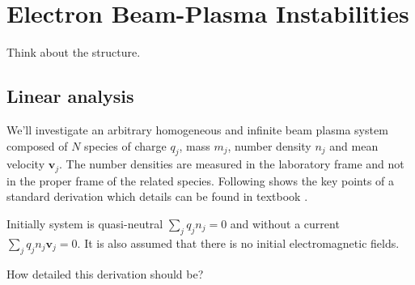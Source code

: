 \chapter{Electron Beam-Plasma Instabilities}
\begin{todo}
  Think about the structure.
\end{todo}

\section{Linear analysis}

We'll investigate an arbitrary homogeneous and infinite beam plasma system composed of
$N$ species of charge $q_j$, mass $m_j$, number density $n_j$ and mean velocity $\mathbf{v}_j$.
The number densities are measured in the laboratory frame and not in the proper frame
of the related species. Following shows the key points of a standard derivation
which details can be found in textbook
\cite{bret_multidimensional_2010,infeld_basic_1975,rowlands_electrodynamics_1970,rosenbluth_handbook_1983}.

Initially system is quasi-neutral $\sum_j q_j n_j = 0$ and without a current
$\sum_j q_j n_j\mathbf{v}_j = 0$. It is also assumed that there is no initial
electromagnetic fields.

\begin{kysymys}
  How detailed this derivation should be? 
\end{kysymys}


